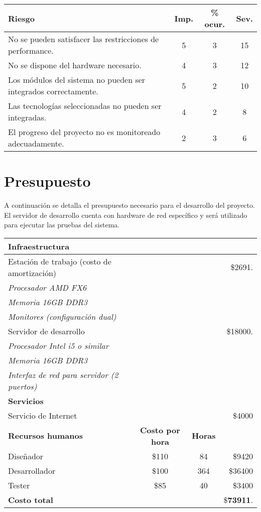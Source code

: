 \begin{tabular}{|l||c|c|c|}

	\hline
	Riesgo & Imp. & \% ocur. & Sev. \\
	\hline
	No se pueden satisfacer las restricciones de performance.  & 5 & 3 & 15 \\
	No se dispone del hardware necesario. & 4 & 3 & 12 \\
	Los módulos del sistema no pueden ser integrados correctamente. & 5 & 2 & 10 \\
	Las tecnologías seleccionadas no pueden ser integradas. & 4 & 2 & 8 \\
	El progreso del proyecto no es monitoreado adecuadamente. & 2 & 3 & 6 \\
	\hline
	
\end{tabular}


\section*{Presupuesto}

A continuación se detalla el presupuesto necesario para el desarrollo del proyecto. El servidor de desarrollo cuenta con hardware de red específico y será utilizado para ejecutar las pruebas del sistema.


\begin{center}

	\begin{tabular}{l c c r}
		\hline \hline
		
		\textbf{Infraestructura} & & & \\ \hline
		Estación de trabajo (costo de amortización)& & & \$2691. \\
		\textit{Procesador AMD FX6} & & &\\
		\textit{Memoria 16GB DDR3} & & & \\
		\textit{Monitores (configuración dual)} & & & \\
		\hline
		Servidor de desarrollo & & & \$18000. \\
		\textit{Procesador Intel i5 o similar} & & & \\
		\textit{Memoria 16GB DDR3} & & & \\
		\textit{Interfaz de red para servidor (2 puertos)} & & & \\
		\hline \hline
		
		\textbf{Servicios} & & &\\ \hline
		Servicio de Internet & & & \$4000 \\
		\hline \hline
		\textbf{Recursos humanos} & \textbf{Costo por hora} & \textbf{Horas} \\
		Diseñador & \$110 & 84 & \$9420 \\
		Desarrollador & \$100 & 364 & \$36400 \\
		Tester & \$85 & 40 & \$3400 \\
		\hline \hline
		\textbf{Costo total} & & & \$\textbf{73911}.
	\end{tabular}
\end{center}



